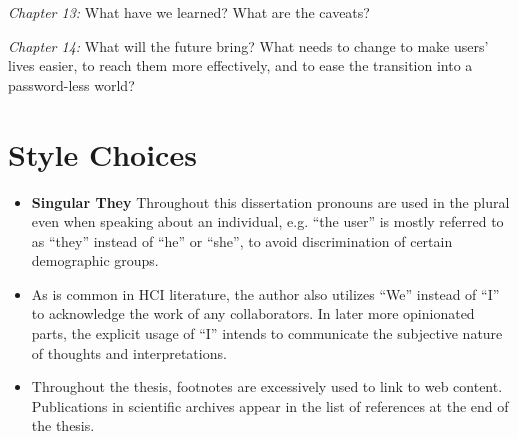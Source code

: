 \textit{Chapter 13:} %
What have we learned? 
What are the caveats?

\textit{Chapter 14:} %
What will the future bring?
What needs to change to make users' lives easier, to reach them more effectively, and to ease the transition into a password-less world?

\section{Style Choices}
\begin{itemize}
\item \textbf{Singular They} Throughout this dissertation pronouns are used in the plural even when speaking about an individual, e.g. ``the user'' is mostly referred to as ``they'' instead of ``he'' or ``she'', to avoid discrimination of certain demographic groups. 
\item As is common in HCI literature, the author also utilizes ``We'' instead of ``I'' to acknowledge the work of any collaborators. In later more opinionated parts, the explicit usage of ``I'' intends to communicate the subjective nature of thoughts and interpretations.
\item Throughout the thesis, footnotes are excessively used to link to web content. Publications in scientific archives appear in the list of references at the end of the thesis.
\end{itemize}
